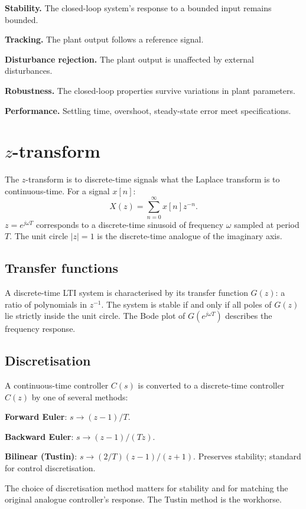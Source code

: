 \textbf{Stability.} The closed-loop system's response to a bounded input remains bounded.

\textbf{Tracking.} The plant output follows a reference signal.

\textbf{Disturbance rejection.} The plant output is unaffected by external disturbances.

\textbf{Robustness.} The closed-loop properties survive variations in plant parameters.

\textbf{Performance.} Settling time, overshoot, steady-state error meet specifications.

\section{$z$-transform}

The $z$-transform is to discrete-time signals what the Laplace transform is to continuous-time. For a signal $x[n]$:
\[
X(z) = \sum_{n=0}^{\infty} x[n] z^{-n}.
\]
$z = e^{j\omega T}$ corresponds to a discrete-time sinusoid of frequency $\omega$ sampled at period $T$. The unit circle $|z| = 1$ is the discrete-time analogue of the imaginary axis.

\subsection{Transfer functions}

A discrete-time LTI system is characterised by its transfer function $G(z)$: a ratio of polynomials in $z^{-1}$. The system is stable if and only if all poles of $G(z)$ lie strictly inside the unit circle. The Bode plot of $G(e^{j\omega T})$ describes the frequency response.

\subsection{Discretisation}

A continuous-time controller $C(s)$ is converted to a discrete-time controller $C(z)$ by one of several methods:

\textbf{Forward Euler}: $s \to (z - 1)/T$.

\textbf{Backward Euler}: $s \to (z - 1)/(Tz)$.

\textbf{Bilinear (Tustin)}: $s \to (2/T)(z - 1)/(z + 1)$. Preserves stability; standard for control discretisation.

The choice of discretisation method matters for stability and for matching the original analogue controller's response. The Tustin method is the workhorse.

